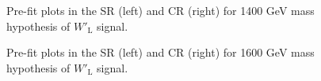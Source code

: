 \begin{figure}[H]
  \centering
  \caption{Pre-fit plots in the SR (left) and CR (right) for 1400 GeV mass hypothesis of $W'_{\text{L}}$ signal.}
  \label{fig:Prefit_WpLH1400_Asimov}
\end{figure}
\begin{figure}[H]
  \centering
  \caption{Pre-fit plots in the SR (left) and CR (right) for 1600 GeV mass hypothesis of $W'_{\text{L}}$ signal.}
  \label{fig:Prefit_WpLH1600_Asimov}
\end{figure}
